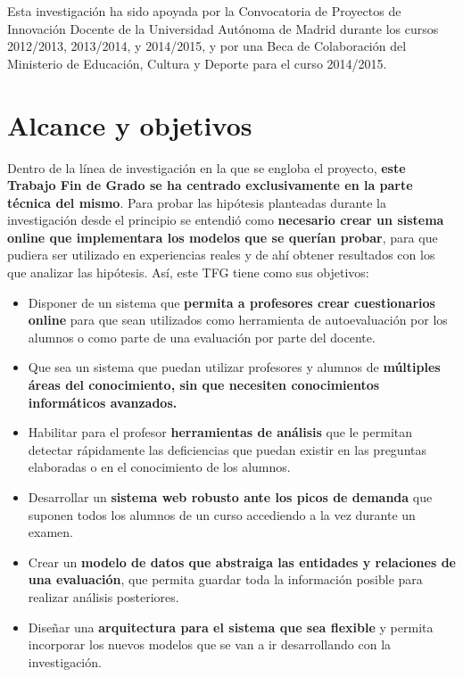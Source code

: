 Esta investigación ha sido apoyada por la Convocatoria de Proyectos de Innovación Docente de la Universidad Autónoma de Madrid durante los cursos 2012/2013, 2013/2014, y 2014/2015, y por una Beca de Colaboración del Ministerio de Educación, Cultura y Deporte para el curso 2014/2015.

\section{Alcance y objetivos}


Dentro de la línea de investigación en la que se engloba el proyecto, \textbf{este Trabajo Fin de Grado se ha centrado exclusivamente en la parte técnica del mismo}. Para probar las hipótesis planteadas durante la investigación desde el principio se entendió como \textbf{necesario crear un sistema online que implementara los modelos que se querían probar}, para que pudiera ser utilizado en experiencias reales y de ahí obtener resultados con los que analizar las hipótesis. Así, este TFG tiene como sus objetivos:

\begin{itemize}
	\item Disponer de un sistema que \textbf{permita a profesores crear cuestionarios online} para que sean utilizados como herramienta de autoevaluación por los alumnos o como parte de una evaluación por parte del docente.
	\item Que sea un sistema que puedan utilizar profesores y alumnos de \textbf{múltiples áreas del conocimiento, sin que necesiten conocimientos informáticos avanzados.}
	\item Habilitar para el profesor \textbf{herramientas de análisis} que le permitan detectar rápidamente las deficiencias que puedan existir en las preguntas  elaboradas o en el conocimiento de los alumnos.
	\item Desarrollar un \textbf{sistema web robusto ante los picos de demanda} que suponen todos los alumnos de un curso accediendo a la vez durante un examen.
	\item Crear un \textbf{modelo de datos que abstraiga las entidades y relaciones de una evaluación}, que permita guardar toda la información posible para realizar análisis posteriores.
	\item Diseñar una \textbf{arquitectura para el sistema que sea flexible} y permita incorporar los nuevos modelos que se van a ir desarrollando con la investigación.
\end{itemize}

